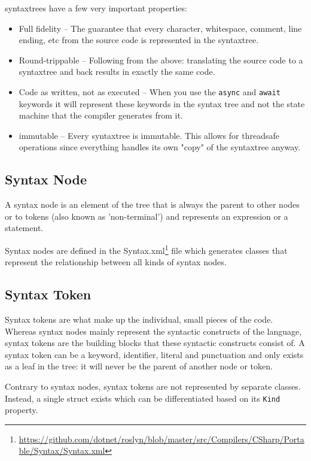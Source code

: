 \Glspl{syntaxtree} have a few very important properties:

\begin{itemize}
	\item Full fidelity -- The guarantee that every character, whitespace, comment, line ending, etc from the source code is represented in the \gls{syntaxtree}.
	\item Round-trippable -- Following from the above: translating the source code to a \gls{syntaxtree} and back results in exactly the same code.
	\item Code as written, not as executed -- When you use the \texttt{async} and \texttt{await} keywords it will represent these keywords in the syntax tree and not the state machine that the compiler generates from it.
	\item \gls{immutable} -- Every \gls{syntaxtree} is immutable. This allows for \gls{threadsafe} operations since everything handles its own "copy" of the \gls{syntaxtree} anyway.
\end{itemize}

\subsection{Syntax Node}
\label{sec:syntax-node}

A syntax node is an element of the tree that is always the parent to other nodes or to tokens (also known as 'non-terminal') and represents an expression or a statement. 

Syntax nodes are defined in the Syntax.xml\footnote{\url{https://github.com/dotnet/roslyn/blob/master/src/Compilers/CSharp/Portable/Syntax/Syntax.xml}} file which generates classes that represent the relationship between all kinds of syntax nodes. 

\subsection{Syntax Token}
\label{sec:syntax-token}

Syntax tokens are what make up the individual, small pieces of the code. Whereas syntax nodes mainly represent the syntactic constructs of the language, syntax tokens are the building blocks that these syntactic constructs consist of.
A syntax token can be a keyword, identifier, literal and punctuation and only exists as a leaf in the tree: it will never be the parent of another node or token.

Contrary to syntax nodes, syntax tokens are not represented by separate classes. Instead, a single struct exists which can be differentiated based on its \texttt{Kind} property. 

